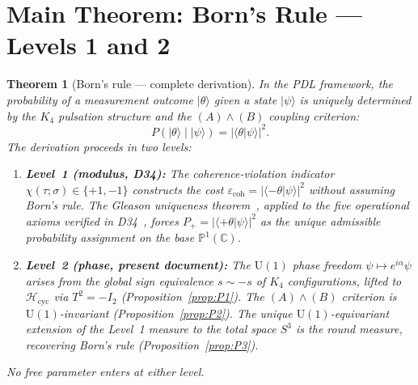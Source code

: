 \documentclass[12pt,a4paper]{article}
\newtheorem{theorem}{Theorem}[section]
\newcommand{\Hcycl}{\mathcal{H}_{\mathrm{cyc}}}
\newcommand{\pket}[1]{|#1\rangle}
\newcommand{\CC}{\mathbb{C}}
\newcommand{\PP}{\mathbb{P}}
\begin{document}
\section{Main Theorem: Born's Rule — Levels 1 and 2}
\label{sec:main_theorem}

\begin{theorem}[Born's rule — complete derivation]
\label{thm:born_complete}
In the PDL framework, the probability of a measurement outcome $\pket{\theta}$
given a state $\pket{\psi}$ is uniquely determined by the $K_4$ pulsation structure
and the $(A)\wedge(B)$ coupling criterion:
\begin{equation}
\boxed{P(\pket{\theta} \mid \pket{\psi}) = |\langle\theta|\psi\rangle|^2.}
\label{eq:born_box}
\end{equation}
The derivation proceeds in two levels:
\begin{enumerate}
\item \textbf{Level~1 (modulus, D34):} The coherence-violation indicator
      $\chi(\tau;\sigma) \in \{+1,-1\}$ constructs the cost
      $\varepsilon_{\mathrm{coh}} = |\langle-\theta|\psi\rangle|^2$ without assuming
      Born's rule. The Gleason uniqueness theorem~\cite{Gleason_1957}, applied to the
      five operational axioms verified in D34~\cite{PDL_D34_2026}, forces $P_+ =
      |\langle+\theta|\psi\rangle|^2$ as the unique admissible probability assignment
      on the base $\PP^1(\CC)$.

\item \textbf{Level~2 (phase, present document):} The $\mathrm{U}(1)$ phase freedom
      $\psi \mapsto e^{i\alpha}\psi$ arises from the global sign equivalence
      $s \sim -s$ of $K_4$ configurations, lifted to $\Hcycl$ via $T^2 = -I_2$
      (Proposition~\ref{prop:P1}). The $(A)\wedge(B)$ criterion is
      $\mathrm{U}(1)$-invariant (Proposition~\ref{prop:P2}). The unique
      $\mathrm{U}(1)$-equivariant extension of the Level~1 measure to the total
      space $S^3$ is the round measure, recovering Born's rule
      (Proposition~\ref{prop:P3}).
\end{enumerate}
No free parameter enters at either level.
\end{theorem}
\end{document}
